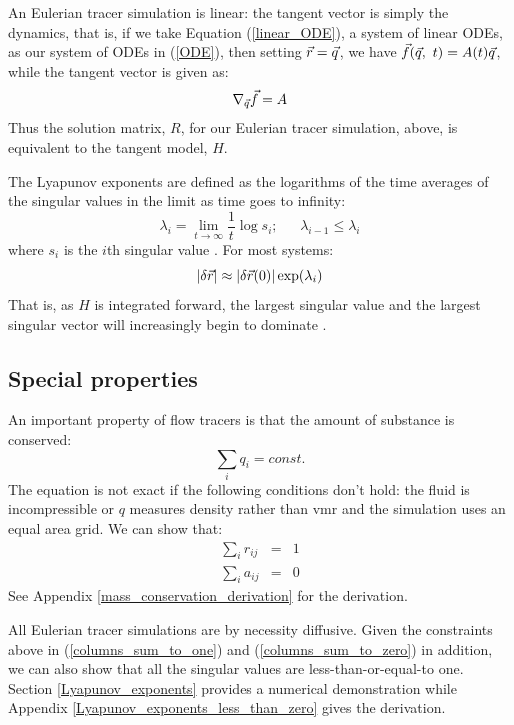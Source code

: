 \documentclass{article}
\begin{document}
An Eulerian tracer simulation is linear: the tangent vector is simply
the dynamics, that is,
if we take Equation (\ref{linear_ODE}), a system of linear ODEs,
as our system of ODEs in
(\ref{ODE}), then setting $\vec r=\vec q$, 
we have $\vec f(\vec q, ~t)=A(t) \vec q$,
while the tangent vector is given as:
\begin{equation}
	\nabla_{\vec q} \vec f = A
\end{equation}
Thus the solution matrix, $R$, for our Eulerian tracer simulation, above,
is equivalent to the tangent model, $H$.

The Lyapunov exponents are defined as the logarithms of the time averages
of the singular values in the limit as time goes to infinity:
\begin{equation}
\lambda_i = \lim_{t \rightarrow \infty} \frac{1}{t} \log s_i;
~~~~~~~\lambda_{i-1} \le \lambda_i
\end{equation}
where $s_i$ is the $i$th singular value \citep{Ott1993}.
For most systems:
\begin{equation}
|\delta \vec r| \approx |\delta \vec r(0) | \exp(\lambda_i)
\label{lambda1}
\end{equation}
That is, as $H$ is integrated forward, the largest singular value and
the largest singular vector will increasingly begin to dominate
\citep{Ott1993}.

\subsection{Special properties}

An important property of flow tracers is that the amount of substance is 
conserved:
\begin{equation}
\sum_i q_i = const.
\end{equation}
The equation is not exact if the following conditions don't hold:
the fluid is incompressible or $q$ measures
density rather than vmr and the simulation uses an equal area grid. 
We can show that:
\begin{eqnarray}
\sum_i r_{ij} & = & 1 
\label{columns_sum_to_one}\\
\sum_i a_{ij} & = & 0
\label{columns_sum_to_zero}
\end{eqnarray}
See Appendix \ref{mass_conservation_derivation} for the derivation.

All Eulerian tracer simulations are by necessity diffusive. 
Given the constraints above in (\ref{columns_sum_to_one}) and
(\ref{columns_sum_to_zero}) in addition, 
we can also show that all the singular values are less-than-or-equal-to one.
Section \ref{Lyapunov_exponents} provides a numerical demonstration while 
Appendix \ref{Lyapunov_exponents_less_than_zero} gives the derivation.
\end{document}
